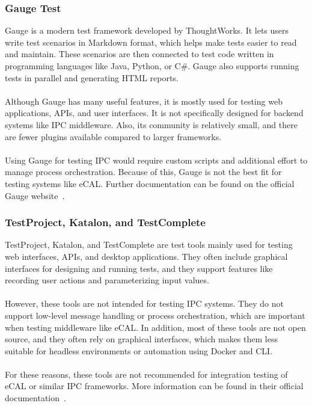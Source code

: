 \subsubsection*{Gauge Test}

Gauge is a modern test framework developed by ThoughtWorks. It lets users write test scenarios in Markdown format, which helps make tests easier to read and maintain. These scenarios are then connected to test code written in programming languages like Java, Python, or C\#. Gauge also supports running tests in parallel and generating HTML reports.
\\
\\
Although Gauge has many useful features, it is mostly used for testing web applications, APIs, and user interfaces. It is not specifically designed for backend systems like IPC middleware. Also, its community is relatively small, and there are fewer plugins available compared to larger frameworks.
\\
\\
Using Gauge for testing IPC would require custom scripts and additional effort to manage process orchestration. Because of this, Gauge is not the best fit for testing systems like eCAL. Further documentation can be found on the official Gauge website~\cite{GaugeDocs}.

\subsubsection*{TestProject, Katalon, and TestComplete}

TestProject, Katalon, and TestComplete are test tools mainly used for testing web interfaces, APIs, and desktop applications. They often include graphical interfaces for designing and running tests, and they support features like recording user actions and parameterizing input values.
\\
\\
However, these tools are not intended for testing IPC systems. They do not support low-level message handling or process orchestration, which are important when testing middleware like eCAL. In addition, most of these tools are not open source, and they often rely on graphical interfaces, which makes them less suitable for headless environments or automation using Docker and CLI.
\\
\\
For these reasons, these tools are not recommended for integration testing of eCAL or similar IPC frameworks. More information can be found in their official documentation~\cite{TestProjectDocs,KatalonDocs,TestCompleteDocs}.

